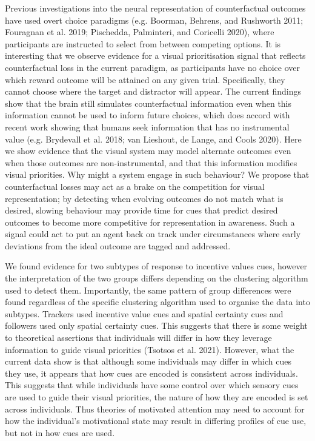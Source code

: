 \documentclass[11pt,halfline,a4paper,]{ouparticle}
\begin{document}
Previous investigations into the neural representation of counterfactual outcomes have used overt choice paradigms (e.g. Boorman, Behrens, and Rushworth 2011; Fouragnan et al. 2019; Pischedda, Palminteri, and Coricelli 2020), where participants are instructed to select from between competing options. It is interesting that we observe evidence for a visual prioritisation signal that reflects counterfactual loss in the current paradigm, as participants have no choice over which reward outcome will be attained on any given trial. Specifically, they cannot choose where the target and distractor will appear. The current findings show that the brain still simulates counterfactual information even when this information cannot be used to inform future choices, which does accord with recent work showing that humans seek information that has no instrumental value (e.g. Brydevall et al. 2018; van Lieshout, de Lange, and Cools 2020). Here we show evidence that the visual system may model alternate outcomes even when those outcomes are non-instrumental, and that this information modifies visual priorities. Why might a system engage in such behaviour? We propose that counterfactual losses may act as a brake on the competition for visual representation; by detecting when evolving outcomes do not match what is desired, slowing behaviour may provide time for cues that predict desired outcomes to become more competitive for representation in awareness. Such a signal could act to put an agent back on track under circumstances where early deviations from the ideal outcome are tagged and addressed.

We found evidence for two subtypes of response to incentive values cues, however the interpretation of the two groups differs depending on the clustering algorithm used to detect them. Importantly, the same pattern of group differences were found regardless of the specific clustering algorithm used to organise the data into subtypes. Trackers used incentive value cues and spatial certainty cues and followers used only spatial certainty cues. This suggests that there is some weight to theoretical assertions that individuals will differ in how they leverage information to guide visual priorities (Tsotsos et al. 2021). However, what the current data show is that although some individuals may differ in which cues they use, it appears that how cues are encoded is consistent across individuals. This suggests that while individuals have some control over which sensory cues are used to guide their visual priorities, the nature of how they are encoded is set across individuals. Thus theories of motivated attention may need to account for how the individual's motivational state may result in differing profiles of cue use, but not in how cues are used.
\end{document}
